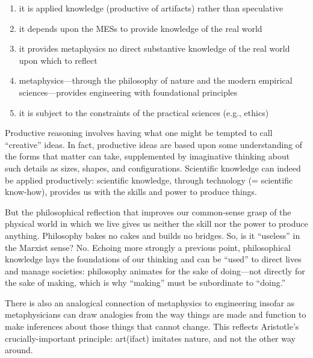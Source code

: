 \begin{enumerate}
\item it is applied knowledge (productive of artifacts) rather than speculative
\item it depends upon the MESs to provide knowledge of the real world
\item it provides metaphysics no direct substantive knowledge of the real world upon which to reflect
\item metaphysics—through the philosophy of nature and the modern empirical sciences—provides engineering with foundational principles
\item it is subject to the constraints of the practical sciences (e.g., ethics)
\end{enumerate}

Productive reasoning involves having what one might be tempted to call “creative” ideas. In fact, productive ideas are based upon some understanding of the forms that matter can take, supplemented by imaginative thinking about such details as sizes, shapes, and configurations. Scientific knowledge can indeed be applied productively: scientific knowledge, through technology (= scientific know-how), provides us with the skills and power to produce things.

But the philosophical reflection that improves our common-sense grasp of the physical world in which we live gives us neither the skill nor the power to produce anything. Philosophy bakes no cakes and builds no bridges. So, is it “useless” in the Marxist sense? No. Echoing more strongly a previous point, philosophical knowledge lays the foundations of our thinking and can be “used” to direct lives and manage societies: philosophy animates for the sake of doing—not directly for the sake of making, which is why “making” must be subordinate to “doing.”

There is also an analogical connection of metaphysics to engineering insofar as metaphysicians can draw analogies from the way things are made and function to make inferences about those things that cannot change. This reflects Aristotle’s crucially-important principle: art(ifact) imitates nature, and not the other way around.

